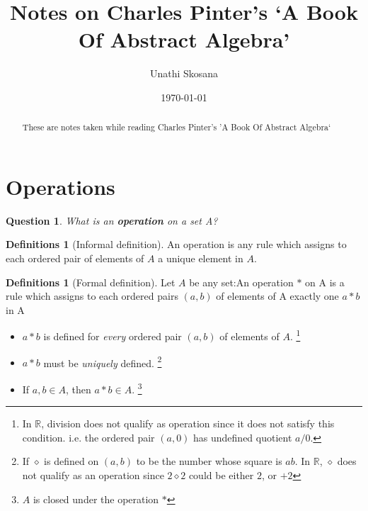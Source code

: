 \documentclass[nohyper,nobib]{tufte-handout}
\title{Notes on Charles Pinter's `A Book Of Abstract Algebra'} %
\author{Unathi Skosana}
\date{\vspace{-5pt}\normalsize \today} %
\newtheorem{quest}[thm]{Question}
\theoremstyle{definition}
\newtheorem{defns}[thm]{Definitions}
\theoremstyle{remark}
\begin{document}
\justifying 
\maketitle

\begin{abstract}
\noindent
These are notes taken while reading Charles Pinter's 'A Book Of Abstract Algebra`
\end{abstract}

\tableofcontents

\section{Operations}

\begin{quest}
	What is an \textbf{operation} on a set A?
\end{quest}

\begin{defns}[Informal definition]
    An operation is any rule which assigns to each ordered pair of elements of $A$ a unique element in $A$.
\end{defns}

\begin{defns}[Formal definition]
	Let $A$ be any set:\newline An operation $*$ on A is a rule which assigns to each ordered pairs $(a,b)$ of elements of A exactly one $a * b$ in A
    \begin{itemize}
        \item $a * b$ is defined for \emph{every} ordered pair $(a,b)$ of elements of $A$. \footnote{In $\mathbb{R}$, division does not qualify as operation since it does not satisfy this condition. i.e. the ordered pair $(a, 0)$ has undefined quotient $a / 0$.}
        \item $a * b$ must be \emph{uniquely} defined. \footnote{If $\diamond$ is defined on $(a, b)$ to be the number whose square is $ab$. In $\mathbb{R}$, $\diamond$ does not qualify as an operation since $2 \diamond 2$  could be either $2$, or $+2$}
        \item If $a, b \in A$, then $a * b \in A$. \footnote{$A$ is closed under the operation $*$}
    \end{itemize}
\end{defns}
\end{document}

